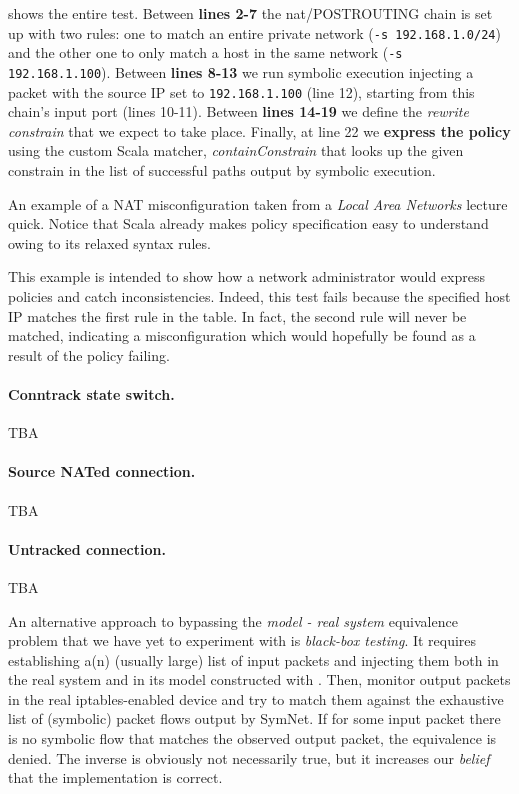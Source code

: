  shows the entire test.  Between
\textbf{lines 2-7} the nat/POSTROUTING chain is set up with two rules: one to
match an entire private network (\lstinline{-s 192.168.1.0/24}) and the other
one to only match a host in the  same network (\lstinline{-s 192.168.1.100}).
Between \textbf{lines 8-13} we run symbolic execution injecting a packet with
the source IP set to \lstinline{192.168.1.100} (line 12), starting from this
chain's input port (lines 10-11).  Between \textbf{lines 14-19} we define the
\emph{rewrite constrain} that we expect to take place.  Finally, at line 22 we
\textbf{express the policy} using the custom Scala matcher,
\emph{containConstrain} that looks up the given constrain in the list of
successful paths output by symbolic execution.

\begin{listing}[H]
  \caption{An example of a NAT misconfiguration taken from a \emph{Local Area
  Networks} lecture quick.  Notice that Scala already makes policy
  specification easy to understand owing to its relaxed syntax rules.}
  \label{lst:unreachable-rule}
\end{listing}

This example is intended to show how a network administrator would express
policies and catch inconsistencies.  Indeed, this test fails because the
specified host IP matches the first rule in the table.  In fact, the second
rule will never be matched, indicating a misconfiguration which would hopefully
be found as a result of the policy failing.

\paragraph{Conntrack state switch.}
TBA

\paragraph{Source NATed connection.}
TBA

\paragraph{Untracked connection.}
TBA

\bigskip

An alternative approach to bypassing the \emph{model - real system} equivalence
problem that we have yet to experiment with is \emph{black-box testing}.  It
requires establishing a(n) (usually large) list of input packets and injecting
them both in the real system and in its model constructed with \TOOL.  Then,
monitor output packets in the real iptables-enabled device and try to match
them against the exhaustive list of (symbolic) packet flows output by SymNet.
If for some input packet there is no symbolic flow that matches the observed
output packet, the equivalence is denied.  The inverse is obviously not
necessarily true, but it increases our \emph{belief} that the implementation is
correct.


